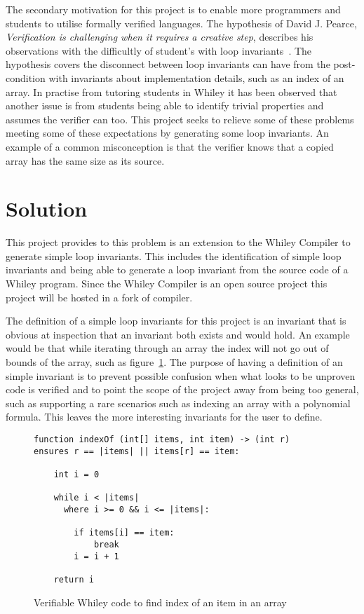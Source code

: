 The secondary motivation for this project is to enable more programmers and
students to utilise formally verified languages.
The hypothesis of David J. Pearce, \textit{Verification is challenging when it requires a creative step},
describes his observations with the difficultly of student's with loop invariants~\cite{spec-usability}.
The hypothesis covers the disconnect between loop invariants can have from the
post-condition with invariants about implementation details, such as an index
of an array.
In practise from tutoring students in Whiley
it has been observed that another issue is from students being able to identify trivial
properties and assumes the verifier can too.
This project seeks to relieve some of these problems meeting some of these
expectations by generating some loop invariants.
An example of a common misconception is that the verifier knows that a copied
array has the same size as its source.

\section{Solution}

This project provides to this problem is an extension to
the Whiley Compiler to generate simple loop invariants.
This includes the identification of simple loop invariants and being able
to generate a loop invariant from the source code of a Whiley program.
Since the Whiley Compiler is an open source project this project will be
hosted in a fork of compiler.

The definition of a simple loop invariants for this project is an invariant that is
obvious at inspection that an invariant both exists and would hold.
An example would be that while iterating through an array the index
will not go out of bounds of the array, such as figure~\ref{lst:whiley-ex-1}.
The purpose of having a definition of an simple invariant is to prevent
possible confusion when what looks to be unproven code is verified and to point
the scope of the project away from being too general, such as supporting
a rare scenarios such as indexing an array with a polynomial formula.
This leaves the more interesting invariants for the user to define.

\begin{figure}[ht]
\begin{lstlisting}
function indexOf (int[] items, int item) -> (int r)
ensures r == |items| || items[r] == item:

    int i = 0

    while i < |items|
      where i >= 0 && i <= |items|:

        if items[i] == item:
            break
        i = i + 1

    return i
\end{lstlisting}
\caption{Verifiable Whiley code to find index of an item in an array}
\label{lst:whiley-ex-1}
\end{figure}

